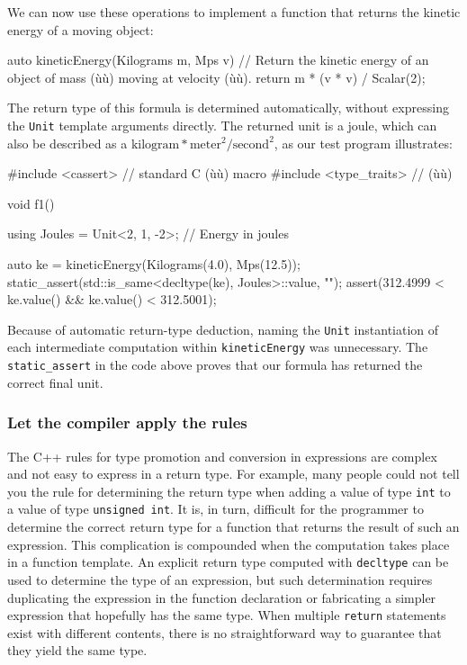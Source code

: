 We can now use these operations to implement a function that returns the
kinetic energy of a moving object:

\begin{emcppslisting}[emcppsbatch=e5]
auto kineticEnergy(Kilograms m, Mps v)
    // Return the kinetic energy of an object of mass (ù{}ù) moving at velocity (ù{}ù).
{
    return m * (v * v) / Scalar(2);
}
\end{emcppslisting}
    

\noindent The return type of this formula is determined automatically, without
expressing the \lstinline!Unit! template arguments directly. The returned
unit is a joule, which can also be described as a $\text{kilogram}\ast
\text{meter}^{2}/\text{second}^{2}$, as our test program illustrates:

\begin{emcppslisting}[emcppsbatch=e5]
#include <cassert>      // standard C (ù{}ù) macro
#include <type_traits>  // (ù{}ù)

void f1()
{
    using Joules = Unit<2, 1, -2>;  // Energy in joules

    auto ke = kineticEnergy(Kilograms(4.0), Mps(12.5));
    static_assert(std::is_same<decltype(ke), Joules>::value, "");
    assert(312.4999 < ke.value() && ke.value() < 312.5001);
}
\end{emcppslisting}
    

\noindent Because of automatic return-type deduction, naming the \lstinline!Unit!
instantiation of each intermediate computation within
\lstinline!kineticEnergy! was unnecessary. The \lstinline!static_assert! in
the code above proves that our formula has returned the correct final
unit.

\subsubsection[Let the compiler apply the rules]{Let the compiler apply the rules}\label{let-the-compiler-apply-the-rules}

The C++ rules for type promotion and conversion in expressions are
complex and not easy to express in a return type. For example, many
people could not tell you the rule for determining the return type when
adding a value of type \lstinline!int! to a value of type
\lstinline!unsigned!~\lstinline!int!. It is, in turn, difficult for the
programmer to determine the correct return type for a function that
returns the result of such an expression. This complication is
compounded when the computation takes place in a function template. An
explicit return type computed with \lstinline!decltype! can be used to
determine the type of an expression, but such determination requires
duplicating the expression in the function declaration or fabricating a
simpler expression that hopefully has the same type. When multiple
\lstinline!return! statements exist with different contents, there is no
straightforward way to guarantee that they yield the same type.

